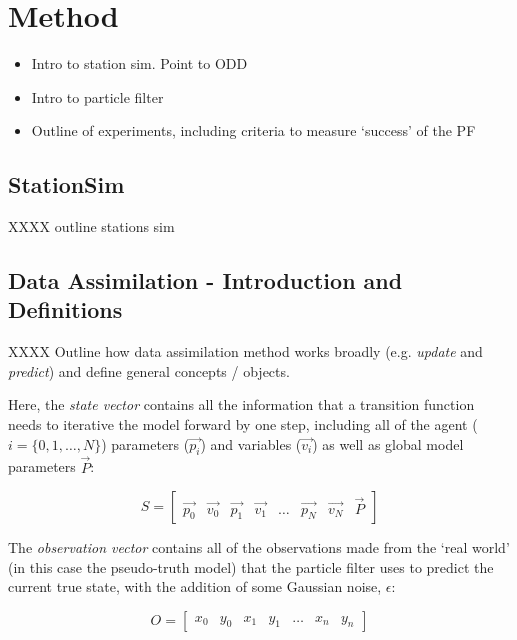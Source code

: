 \section{Method\label{Method}}

\begin{itemize}
\item Intro to station sim. Point to ODD
\item Intro to particle filter
\item Outline of experiments, including criteria to measure `success' of the PF
\end{itemize}

\subsection{StationSim}

XXXX outline stations sim


\subsection{Data Assimilation - Introduction and Definitions}

XXXX Outline how data assimilation method works broadly (e.g. \textit{update} and \textit{predict}) and define general concepts / objects.


Here, the \textit{state vector} contains all the information that a transition function needs to iterative the model forward by one step, including all of the agent ($i = \{ 0, 1, \dots, N \} $) parameters ($\overrightarrow{p_i}$) and variables ($\overrightarrow{v_i}$) as well as global model parameters $\overrightarrow{P}$:

\begin{equation}
  S  = \left[ \begin{array}{cccccccc}
\overrightarrow{p_0} & \overrightarrow{v_0} & \overrightarrow{p_1} &  \overrightarrow{v_1} &  \dots &  \overrightarrow{p_N} &  \overrightarrow{v_N} & \overrightarrow{P} 
\end{array} \right]
\end{equation} 

The \textit{observation vector} contains all of the observations made from the `real world' (in this case the pseudo-truth model) that the particle filter uses to predict the current true state, with the addition of some Gaussian noise, $\epsilon$:

\begin{equation}
  O  = \left[ \begin{array}{ccccccc}
x_0 & y_0 & x_1 & y_1 & \dots & x_n & y_n 
\end{array} \right]
\end{equation} 

